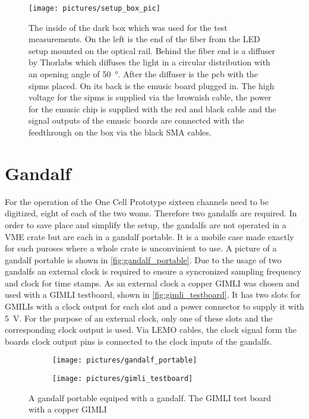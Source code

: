 \begin{figure}
	\centering
	\texttt{[image: pictures/setup\_box\_pic]}
	\caption[Picture of the inside of the dark box.]{The inside of the dark box which was used for the test measurements. On the left is the end of the fiber from the LED setup mounted on the optical rail. Behind the fiber end is a diffuser by Thorlabs which diffuses the light in a circular distribution with an opening angle of \SI{50}{\degree}. After the diffuser is the \ac{pcb} with the \acp{sipm} placed. On its back is the \ac{emusic} board plugged in. The high voltage for the \acp{sipm} is supplied via the brownish cable, the power for the \ac{emusic} chip is supplied with the red and black cable and the signal outputs of the \ac{emusic} boards are connected with the feedthrough on the box via the black SMA cables.}
	\label{fig:setup_box_pic}
\end{figure}

\section{Gandalf}

For the operation of the One Cell Prototype sixteen channels need to be digitized, eight of each of the two \acp{wom}.
Therefore two \acp{gandalf} are required.
In order to save place and simplify the setup, the \acp{gandalf} are not operated in a VME crate but are each in a \ac{gandalf} portable.
It is a mobile case made exactly for such puroses where a whole crate is unconvinient to use.
A picture of a \ac{gandalf} portable is shown in \autoref{fig:gandalf_portable}.
Due to the usage of two \acp{gandalf} an external clock is required to ensure a syncronized sampling frequency and clock for time stamps.
As an external clock a copper GIMLI was chosen and used with a GIMLI testboard, shown in \autoref{fig:gimli_testboard}.
It has two slots for GMILIs with a clock output for each slot and a power connector to supply it with \SI{5}{\volt}.
For the purpose of an external clock, only one of these slots and the corresponding clock output is used.
Via LEMO cables, the clock signal form the boards clock output pins is connected to the clock inputs of the \acp{gandalf}.
\begin{figure}
	\centering
	\begin{subfigure}[b]{.4\textwidth}
		\centering
		\texttt{[image: pictures/gandalf\_portable]} 
		\caption[A \ac{gandalf} portable equiped with a \ac{gandalf}.]{}
		\label{}
	\end{subfigure}
	\begin{subfigure}[b]{.55\textwidth}
		\centering
		\texttt{[image: pictures/gimli\_testboard]}
		\caption[]{}
		\label{}
	\end{subfigure}
	\caption[]{A \ac{gandalf} portable equiped with a \ac{gandalf}. The GIMLI test board with a copper GIMLI}
	\label{}
\end{figure}
